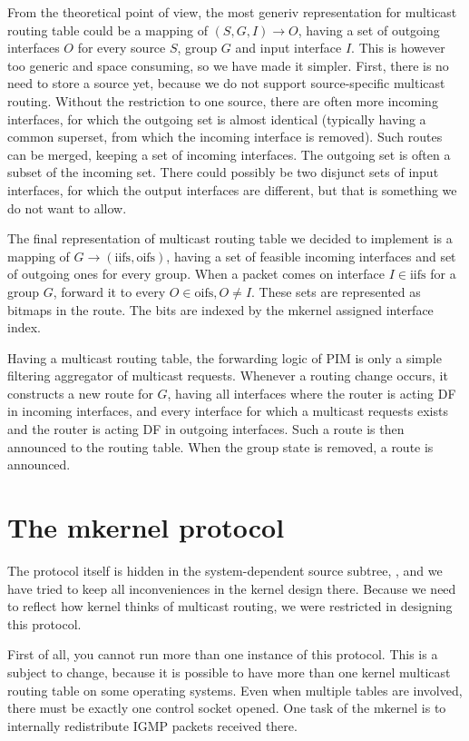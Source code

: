 From the theoretical point of view, the most generiv representation for
multicast routing table could be a mapping of $(S, G, I) \rightarrow O$,
having a set of outgoing interfaces $O$ for every source $S$, group $G$ and
input interface $I$. This is however too generic and space consuming, so we
have made it simpler. First, there is no need to store a source yet, because we
do not support source-specific multicast routing. Without the restriction to
one source, there are often more incoming interfaces, for which the outgoing
set is almost identical (typically having a common superset, from which the
incoming interface is removed). Such routes can be merged, keeping a set of
incoming interfaces. The outgoing set is often a subset of the incoming set.
There could possibly be two disjunct sets of input interfaces, for which the
output interfaces are different, but that is something we do not want to allow.

The final representation of multicast routing table we decided to implement is
a mapping of $G \rightarrow (\mathrm{iifs}, \mathrm{oifs})$, having a set of feasible incoming
interfaces and set of outgoing ones for every group. When a packet comes on
interface $I \in \mathrm{iifs}$ for a group $G$, forward it to every $O \in \mathrm{oifs}, O \neq I$.
These sets are represented as bitmaps in the route. The bits are indexed by the
mkernel assigned interface index.

Having a multicast routing table, the forwarding logic of PIM is only a simple
filtering aggregator of multicast requests. Whenever a routing change occurs,
it constructs a new route for $G$, having all interfaces where the router is
acting DF in incoming interfaces, and every interface for which a multicast
requests exists and the router is acting DF in outgoing interfaces. Such
a route is then announced to the routing table. When the group state is
removed, a \NULL{} route is announced.

\section{The mkernel protocol}
The protocol itself is hidden in the system-dependent source subtree,
, and we have tried to keep all inconveniences in the
kernel design there. Because we need to reflect how kernel thinks of multicast
routing, we were restricted in designing this protocol.

First of all, you cannot run more than one instance of this protocol. This is
a subject to change, because it is possible to have more than one kernel
multicast routing table on some operating systems. Even when multiple tables
are involved, there must be exactly one control socket opened. One task of the
mkernel is to internally redistribute IGMP packets received there.


